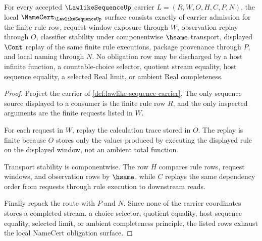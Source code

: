 \begin{theorem}
\label{thm:lawlike-sequence-namecert-obligations}
For every accepted $\LawlikeSequenceUp$ carrier $L=(R,W,O,H,C,P,N)$, the local $\NameCert_{\LawlikeSequenceUp}$ surface consists exactly of carrier admission for the finite rule row, request-window exposure through $W$, observation replay through $O$, classifier stability under componentwise $\hsame$ transport, displayed $\Cont$ replay of the same finite rule executions, package provenance through $P$, and local naming through $N$. No obligation row may be discharged by a host infinite function, a countable-choice selector, quotient stream equality, host sequence equality, a selected Real limit, or ambient Real completeness.
\end{theorem}
\begin{proof}
Project the carrier of \autoref{def:lawlike-sequence-carrier}. The only sequence source displayed to a consumer is the finite rule row $R$, and the only inspected arguments are the finite requests listed in $W$.

For each request in $W$, replay the calculation trace stored in $O$. The replay is finite because $O$ stores only the values produced by executing the displayed rule on the displayed window, not an ambient total function.

Transport stability is componentwise. The row $H$ compares rule rows, request windows, and observation rows by $\hsame$, while $C$ replays the same dependency order from requests through rule execution to downstream reads.

Finally repack the route with $P$ and $N$. Since none of the carrier coordinates stores a completed stream, a choice selector, quotient equality, host sequence equality, selected limit, or ambient completeness principle, the listed rows exhaust the local NameCert obligation surface.
\end{proof}

